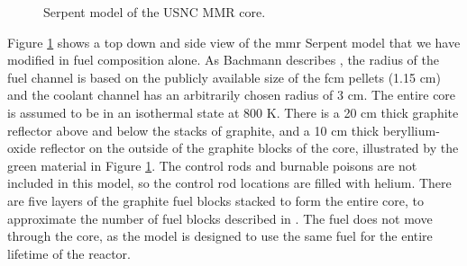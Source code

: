 \begin{figure}[!ht]
    \hfill
    \caption{Serpent model of the USNC MMR core.}
    \label{fig:mmr_core}
\end{figure}

Figure \ref{fig:mmr_core} shows a top down and side view of the \gls{mmr} Serpent model \cite{bachmann_mmr_like_2023} that we have modified in fuel composition alone. As Bachmann describes \cite{bachmann_thesis_2023}, the radius of the fuel channel is based on the publicly available size of the \gls{fcm} pellets (1.15 cm) and the coolant channel has an arbitrarily chosen radius of 3 cm. The entire core is assumed to be in an isothermal state at 800 K. There is a 20 cm thick graphite reflector above and below the stacks of graphite, and a 10 cm thick beryllium-oxide reflector on the outside of the graphite blocks of the core, illustrated by the green material in Figure \ref{fig:mmr_core}. The control rods and burnable poisons are not included in this model, so the control rod locations are filled with helium. There are five layers of the graphite fuel blocks stacked to form the entire core, to approximate the number of fuel blocks described in \cite{usnc_design_2021}. The fuel does not move through the core, as the model is designed to use the same fuel for the entire lifetime of the reactor.



